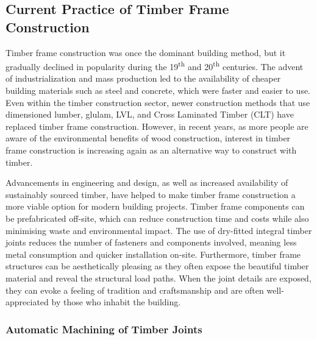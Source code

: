     
\subsection{Current Practice of Timber Frame Construction}
\label{subsection:introduction-current-practice-of-timber-frame-construction}

Timber frame construction was once the dominant building method, but it gradually declined in popularity during the 19\textsuperscript{th} and 20\textsuperscript{th} centuries. The advent of industrialization and mass production led to the availability of cheaper building materials such as steel and concrete, which were faster and easier to use. Even within the timber construction sector, newer construction methods that use dimensioned lumber, glulam, LVL, and Cross Laminated Timber (CLT) have replaced timber frame construction. However, in recent years, as more people are aware of the environmental benefits of wood construction, interest in timber frame construction is increasing again as an alternative way to construct with timber. 

Advancements in engineering and design, as well as increased availability of sustainably sourced timber, have helped to make timber frame construction a more viable option for modern building projects. Timber frame components can be prefabricated off-site, which can reduce construction time and costs while also minimising waste and environmental impact. The use of dry-fitted integral timber joints reduces the number of fasteners and components involved, meaning less metal consumption and quicker installation on-site. Furthermore, timber frame structures can be aesthetically pleasing as they often expose the beautiful timber material and reveal the structural load paths. When the joint details are exposed, they can evoke a feeling of tradition and craftsmanship and are often well-appreciated by those who inhabit the building.

\subsubsection{Automatic Machining of Timber Joints}
\label{subsubsection:introduction-automatic-machining-of-timber-joints}

